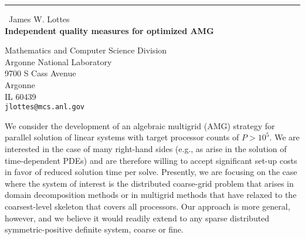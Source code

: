 \documentclass{report}
\begin{document}
\begin{center}
\rule{6in}{1pt} \
{\large James W. Lottes \\
{\bf Independent quality measures for optimized AMG}}

Mathematics and Computer Science Division \\ Argonne National Laboratory \\ 9700 S Cass Avenue \\ Argonne \\ IL 60439
\\
{\tt jlottes@mcs.anl.gov}\end{center}

\newcommand{\norm}[1]{\lVert #1 \rVert}
\newcommand{\vv}{\mathbf{v}}
\newcommand{\vz}{\mathbf{0}}
\newcommand{\ff}{_{f\hspace{-0.1667 em}f}}
\newcommand{\fc}{_{f\hspace{-0.0833 em}c}}
\newcommand{\cf}{_{c\hspace{-0.0833 em}f}}
\newcommand{\cc}{_{c\hspace{0 em}c}}
\newcommand{\tg}{_{\text{tg}}}
\newcommand{\isdef}{\equiv}

We consider the development of an algebraic multigrid (AMG) strategy for
parallel solution of linear systems with target processor counts of
$P > 10^5$. We are interested in the case of many right-hand sides (e.g., as
arise in the solution of time-dependent PDEs) and are therefore willing to
accept significant set-up costs in favor of reduced solution time per
solve. Presently, we are focusing on the case where the system of interest
is the distributed coarse-grid problem that arises in domain decomposition
methods or in multigrid methods that have relaxed to the coarsest-level
skeleton that covers all processors. Our approach is more general, however,
and we believe it would readily extend to any sparse distributed
symmetric-positive definite system, coarse or fine.
\end{document}
